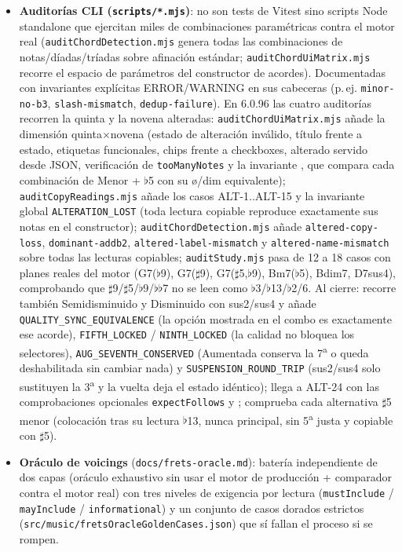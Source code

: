 \documentclass[a4paper,11pt,oneside]{report}
\newcommand{\flt}{\ensuremath{\flat}}
\newcommand{\shp}{\ensuremath{\sharp}}
\begin{document}
\begin{itemize}
\item \textbf{Auditorías CLI (\lstinline!scripts/*.mjs!)}: no son tests de Vitest sino scripts Node standalone que ejercitan miles de combinaciones paramétricas contra el motor real (\lstinline!auditChordDetection.mjs! genera todas las combinaciones de notas/díadas/tríadas sobre afinación estándar; \lstinline!auditChordUiMatrix.mjs! recorre el espacio de parámetros del constructor de acordes). Documentadas con invariantes explícitas ERROR/WARNING en sus cabeceras (p.\,ej. \lstinline!minor-no-b3!, \lstinline!slash-mismatch!, \lstinline!dedup-failure!). En 6.0.96 las cuatro auditorías recorren la quinta y la novena alteradas: \lstinline!auditChordUiMatrix.mjs! añade la dimensión quinta$\times$novena (estado de alteración inválido, título frente a estado, etiquetas funcionales, chips frente a checkboxes, alterado servido desde JSON, verificación de \lstinline!tooManyNotes! y la invariante \texttt{}, que compara cada combinación de Menor + \flt5 con su ø/dim equivalente); \lstinline!auditCopyReadings.mjs! añade los casos ALT-1..ALT-15 y la invariante global \lstinline!ALTERATION_LOST! (toda lectura copiable reproduce exactamente sus notas en el constructor); \lstinline!auditChordDetection.mjs! añade \lstinline!altered-copy-loss!, \lstinline!dominant-addb2!, \lstinline!altered-label-mismatch! y \lstinline!altered-name-mismatch! sobre todas las lecturas copiables; \lstinline!auditStudy.mjs! pasa de 12 a 18 casos con planes reales del motor (G7(\flt9), G7(\shp9), G7(\shp5,\flt9), Bm7(\flt5), Bdim7, D7sus4), comprobando que \shp9/\shp5/\flt9/\flt\flt7 no se leen como \flt3/\flt13/\flt2/6. Al cierre: \texttt{} recorre también Semidisminuido y Disminuido con sus2/sus4 y añade \lstinline!QUALITY_SYNC_EQUIVALENCE! (la opción mostrada en el combo es exactamente ese acorde), \lstinline!FIFTH_LOCKED! / \lstinline!NINTH_LOCKED! (la calidad no bloquea los selectores), \lstinline!AUG_SEVENTH_CONSERVED! (Aumentada conserva la 7\textsuperscript{a} o queda deshabilitada sin cambiar nada) y \lstinline!SUSPENSION_ROUND_TRIP! (sus2/sus4 solo sustituyen la 3\textsuperscript{a} y la vuelta deja el estado idéntico); \texttt{} llega a ALT-24 con las comprobaciones opcionales \lstinline!expectFollows! y \texttt{}; \texttt{} comprueba cada alternativa \shp5 menor (colocación tras su lectura \flt13, nunca principal, sin 5\textsuperscript{a} justa y copiable con \shp5).
\item \textbf{Oráculo de voicings} (\lstinline!docs/frets-oracle.md!): batería independiente de dos capas (oráculo exhaustivo sin usar el motor de producción + comparador contra el motor real) con tres niveles de exigencia por lectura (\lstinline!mustInclude! / \lstinline!mayInclude! / \lstinline!informational!) y un conjunto de casos dorados estrictos (\lstinline!src/music/fretsOracleGoldenCases.json!) que sí fallan el proceso si se rompen.
\end{itemize}
\end{document}
